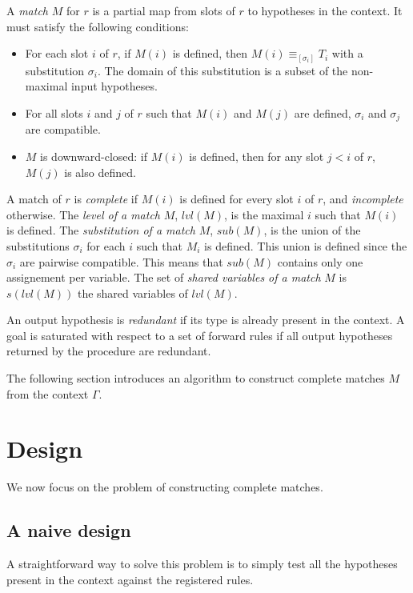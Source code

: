 \documentclass[runningheads]{llncs}
\begin{document}
A \textit{match} $M$ for $r$ is a partial map from slots of $r$ to hypotheses in
the context.
It must satisfy the following conditions:
\begin{itemize}
\item For each slot $i$ of $r$, if $M(i)$ is defined, then
    $M(i) \equiv_{[\sigma_i]} T_i$ with a substitution $\sigma_i$.
    The domain of this substitution is a subset of the non-maximal input hypotheses.
\item For all slots $i$ and $j$ of $r$ such that $M(i)$ and $M(j)$ are defined,
    $\sigma_i$ and $\sigma_j$ are compatible.
\item $M$ is downward-closed: if $M(i)$ is defined, then for any slot $j < i$ of
    $r$, $M(j)$ is also defined.

\end{itemize}
A match of $r$ is \textit{complete} if $M(i)$ is defined for every slot $i$ of $r$, and
\textit{incomplete} otherwise.
The \textit{level of a match} $M$, $lvl(M)$, is the maximal $i$ such that $M(i)$ 
is defined.
The \textit{substitution of a match} $M$, $sub(M)$, is the union of the
substitutions $\sigma_i$ for each $i$ such that $M_i$ is defined.
This union is defined since the $\sigma_i$ are pairwise compatible.
This means that $sub(M)$ contains only one assignement per variable.
The set of \textit{shared variables of a match} $M$ is $s(lvl(M))$ the
shared variables of $lvl(M)$.

An output hypothesis is \textit{redundant} if its type is already present in the context.
A goal is saturated with respect to a set of forward rules if all
output hypotheses returned by the procedure are redundant.

The following section introduces an algorithm to construct complete matches $M$ 
from the context $\Gamma$.

\section{Design}

We now focus on the problem of constructing complete matches.

\subsection{A naive design}

A straightforward way to solve this problem is to simply test all the hypotheses present in the
context against the registered rules.
\end{document}
